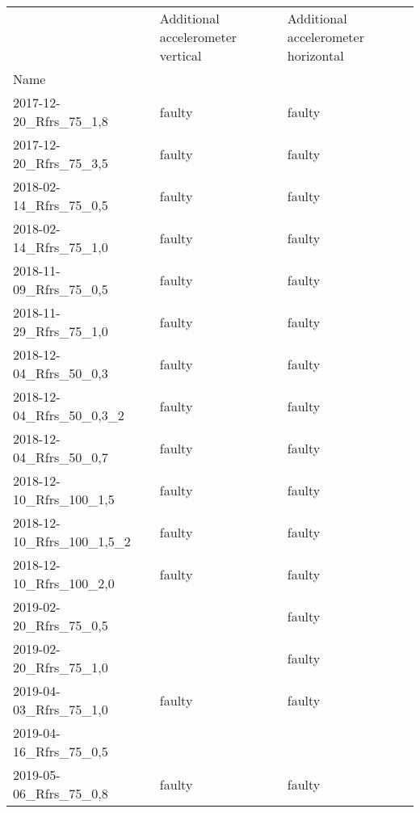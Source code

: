 \begin{tabular}{lll}
\toprule
{} & Additional accelerometer vertical & Additional accelerometer horizontal \\
Name                          &                                   &                                     \\
\midrule
2017-12-20\_Rfrs\_75\_1,8     &                            faulty &                              faulty \\
2017-12-20\_Rfrs\_75\_3,5     &                            faulty &                              faulty \\
2018-02-14\_Rfrs\_75\_0,5     &                            faulty &                              faulty \\
2018-02-14\_Rfrs\_75\_1,0     &                            faulty &                              faulty \\
2018-11-09\_Rfrs\_75\_0,5     &                            faulty &                              faulty \\
2018-11-29\_Rfrs\_75\_1,0     &                            faulty &                              faulty \\
2018-12-04\_Rfrs\_50\_0,3     &                            faulty &                              faulty \\
2018-12-04\_Rfrs\_50\_0,3\_2  &                            faulty &                              faulty \\
2018-12-04\_Rfrs\_50\_0,7     &                            faulty &                              faulty \\
2018-12-10\_Rfrs\_100\_1,5    &                            faulty &                              faulty \\
2018-12-10\_Rfrs\_100\_1,5\_2 &                            faulty &                              faulty \\
2018-12-10\_Rfrs\_100\_2,0    &                            faulty &                              faulty \\
2019-02-20\_Rfrs\_75\_0,5     &                                   &                              faulty \\
2019-02-20\_Rfrs\_75\_1,0     &                                   &                              faulty \\
2019-04-03\_Rfrs\_75\_1,0     &                            faulty &                              faulty \\
2019-04-16\_Rfrs\_75\_0,5     &                                   &                                     \\
2019-05-06\_Rfrs\_75\_0,8     &                            faulty &                              faulty \\
\bottomrule
\end{tabular}
